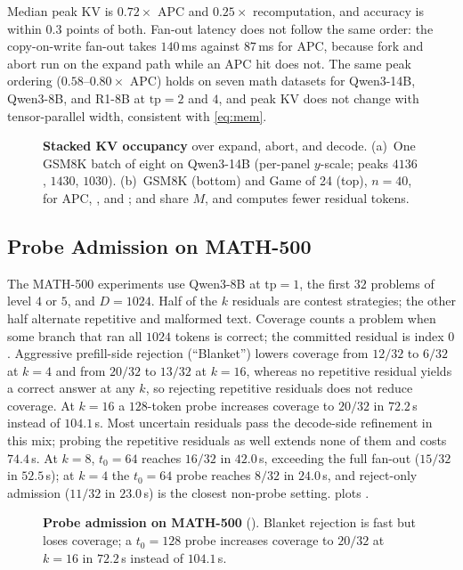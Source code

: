 Median peak KV is $0.72\times$ APC and $0.25\times$ recomputation, and accuracy is within $0.3$ points of both.
Fan-out latency does not follow the same order: the copy-on-write fan-out takes $140$\,ms against $87$\,ms for APC, because fork and abort run on the expand path while an APC hit does not.
The same peak ordering ($0.58$--$0.80\times$ APC) holds on seven math datasets for Qwen3-14B, Qwen3-8B, and R1-8B at $\mathrm{tp}{=}2$ and $4$, and peak KV does not change with tensor-parallel width, consistent with \eqref{eq:mem}.

\begin{figure}[t]
\centering
\resizebox{\textwidth}{!}{}
\caption{\textbf{Stacked KV occupancy} over expand, abort, and decode.
(a)~One GSM8K batch of eight on Qwen3-14B (per-panel $y$-scale; peaks $4136$, $1430$, $1030$).
(b)~GSM8K (bottom) and Game of 24 (top), $n{=}40$, for APC, \cowonly, and \sys; \cowonly and \sys share $M$, and \sys computes fewer residual tokens.}
\label{fig:eval-stack}
\end{figure}

\subsection{Probe Admission on MATH-500}
\label{sec:eval-grow}

The MATH-500 experiments use Qwen3-8B at $\mathrm{tp}{=}1$, the first $32$ problems of level $4$ or $5$, and $D{=}1024$.
Half of the $k$ residuals are contest strategies; the other half alternate repetitive and malformed text.
Coverage counts a problem when some branch that ran all $1024$ tokens is correct; the committed residual is index $0$.
Aggressive prefill-side rejection (``Blanket'') lowers coverage from $12/32$ to $6/32$ at $k{=}4$ and from $20/32$ to $13/32$ at $k{=}16$, whereas no repetitive residual yields a correct answer at any $k$, so rejecting repetitive residuals does not reduce coverage.
At $k{=}16$ a $128$-token probe increases coverage to $20/32$ in $72.2$\,s instead of $104.1$\,s.
Most uncertain residuals pass the decode-side refinement in this mix; probing the repetitive residuals as well extends none of them and costs $74.4$\,s.
At $k{=}8$, $t_0{=}64$ reaches $16/32$ in $42.0$\,s, exceeding the full fan-out ($15/32$ in $52.5$\,s); at $k{=}4$ the $t_0{=}64$ probe reaches $8/32$ in $24.0$\,s, and reject-only admission ($11/32$ in $23.0$\,s) is the closest non-probe setting.
 plots .

\begin{figure}[t]
\centering
\resizebox{\textwidth}{!}{}
\caption{\textbf{Probe admission on MATH-500} ().
Blanket rejection is fast but loses coverage; a $t_0{=}128$ probe increases coverage to $20/32$ at $k{=}16$ in $72.2$\,s instead of $104.1$\,s.}
\label{fig:eval-grow}
\end{figure}

